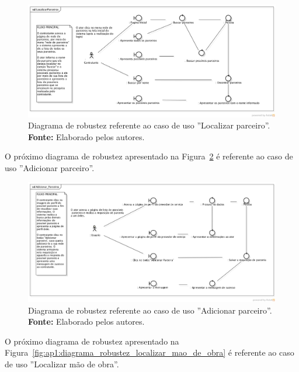 \captionsetup[figure]{list=no}
\begin{figure}[h!]
	\centerline{\includegraphics[scale=0.4]{./imagens/apendices/diagrama-robustez-localizar-parceiros.png}}
	\caption[Diagrama de robustez referente ao caso de uso ''Localizar parceiro''.]
	{Diagrama de robustez referente ao caso de uso ''Localizar parceiro''. \textbf{Fonte:} Elaborado pelos autores.}
	\label{fig:ap1:diagrama_robustez_localizar_parceiro}
\end{figure}

O próximo diagrama de robustez apresentado na Figura~\ref{fig:ap1:diagrama_robustez_adicionar_parceiro} é referente ao caso de uso ''Adicionar parceiro''.

\captionsetup[figure]{list=no}
\begin{figure}[h!]
	\centerline{\includegraphics[scale=0.4]{./imagens/apendices/diagrama-robustez-adicionar-parceiro.png}}
	\caption[Diagrama de robustez referente ao caso de uso ''Adicionar parceiro''.]
	{Diagrama de robustez referente ao caso de uso ''Adicionar parceiro''. \textbf{Fonte:} Elaborado pelos autores.}
	\label{fig:ap1:diagrama_robustez_adicionar_parceiro}
\end{figure}

O próximo diagrama de robustez apresentado na Figura~\ref{fig:ap1:diagrama_robustez_localizar_mao_de_obra} é referente ao caso de uso ''Localizar mão de obra''.

